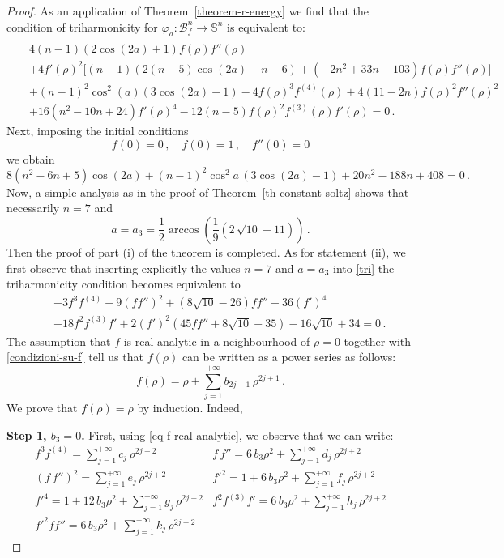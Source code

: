 \documentclass[11pt]{amsart}
\theoremstyle{plain}
\theoremstyle{definition}
\numberwithin{equation}{section}
\def \s{{\mathbb S}}
\numberwithin{equation}{section}
\begin{document}
\begin{proof} As an application of Theorem~\ref{theorem-r-energy} we find that the condition of triharmonicity for $\varphi_a:\mathcal{B}^n_f \to \s^n$ is equivalent to:
{\small
\begin{eqnarray}\label{tri}
&&\\\nonumber
&& 4 (n-1) (2 \cos (2 a)+1) f(\rho) f''(\rho)\\\nonumber
&&+4 f'(\rho)^2 \Big [(n-1) (2 (n-5) \cos (2 a)+n-6)+\left(-2 n^2+33 n-103\right) f(\rho) f''(\rho)\Big]\\\nonumber
&&+(n-1)^2 \cos ^2(a) (3 \cos (2 a)-1)-4 f(\rho)^3 f^{(4)}(\rho)+4 (11-2 n) f(\rho)^2 f''(\rho)^2\\\nonumber
&&+16 \left(n^2-10 n+24\right) f'(\rho)^4-12 (n-5) f(\rho)^2 f^{(3)}(\rho) f'(\rho)=0\,.
\end{eqnarray}
}
Next, imposing the initial conditions
\[
f(0)=0\,, \quad f(0)=1\,,\quad f''(0)=0
\]
we obtain
\[
8 \left(n^2-6 n+5\right) \cos (2 a)+(n-1)^2 \cos ^2a \,(3 \cos (2 a)-1)+20 n^2-188 n+408=0\,.
\]
Now, a simple analysis as in the proof of Theorem~\ref{th-constant-soltz} shows that necessarily $n=7$ and 
$$a=a_3=\dfrac{1}{2} \arccos\left(\dfrac{1}{9} \left(2\,\sqrt{10}-11\right)\right)\,.
$$ 
Then the proof of part (i) of the theorem is completed. As for statement (ii), we first observe that inserting explicitly the values $n=7$ and $a=a_3$ into \eqref{tri} the triharmonicity condition becomes equivalent to
\begin{eqnarray}\label{eq:main}
&&-3 f^3 f^{(4)}
-9 (f f'')^2
+(8\sqrt{10}-26) f f''
+36 (f')^4
\\\nonumber
&&-18 f^2 f^{(3)} f'
+2 (f')^2 (45 f f'' + 8\sqrt{10}-35)
-16\sqrt{10}+34
=0\,.
\end{eqnarray}
The assumption that $f$ is real analytic in a neighbourhood of $\rho=0$ together with \eqref{condizioni-su-f} tell us that $f(\rho)$ can be written as a power series as follows:
\begin{equation}\label{eq-f-real-analytic}
f(\rho)=\rho+\sum_{j=1}^{+\infty}b_{2j+1}\,\rho^{2j+1}\,.
\end{equation}
We prove that $f(\rho)=\rho$ by induction. Indeed,

\textbf{Step 1, $b_3=0$.} First, using \eqref{eq-f-real-analytic}, we observe that we can write:
\begin{equation}\label{eq-espressioni-ff''-f'2}
\begin{array}{lll}
f^3 f^{(4)}=\sum_{j=1}^{+\infty} c_j\,\rho^{2j+2} &
f\,f''=6 \, b_3 \rho^2+\sum_{j=1}^{+\infty} d_j\,\rho^{2j+2}\\[8pt]
(f\,f'')^2=\sum_{j=1}^{+\infty} e_j\,\rho^{2j+2} &
f'^2=1+6 \,b_3 \rho^2 +\sum_{j=1}^{+\infty} f_j\,\rho^{2j+2}\\[8pt]
f'^4=1+12 \, b_3 \rho^2 +\sum_{j=1}^{+\infty} g_j\,\rho^{2j+2}&
f^2 f^{(3)}f'=6 \, b_3 \rho^2+\sum_{j=1}^{+\infty} h_j\,\rho^{2j+2}\\[8pt]
f'^2 f f''=6 \, b_3 \rho^2+\sum_{j=1}^{+\infty} k_j\,\rho^{2j+2}
\end{array}
\end{equation}


\end{proof}
\end{document}
